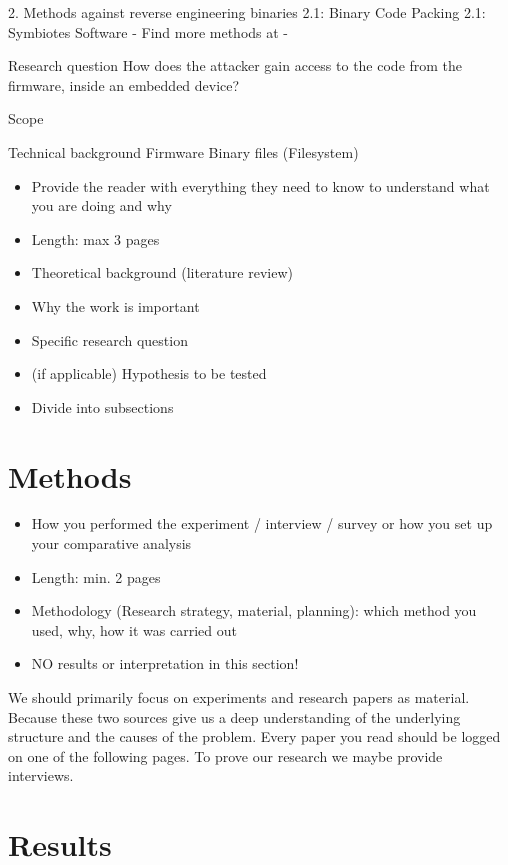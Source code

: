 \documentclass[]{report}
\begin{document}
2. Methods against reverse engineering binaries
2.1: Binary Code Packing
2.1: Symbiotes Software - 
Find more methods at - 

Research question
How does the attacker gain access to the code from the firmware, inside an embedded device?

Scope

Technical background
Firmware
Binary files (Filesystem)

\begin{itemize}
	\item Provide the reader with everything they need to know to understand what you are doing and why

	\item Length: max 3 pages
	\item Theoretical background (literature review)
	\item Why the work is important
	\item Specific research question
	\item (if applicable) Hypothesis to be tested
	\item Divide into subsections
\end{itemize}



\section{Methods}
\begin{itemize}
	\item How you performed the experiment / interview / survey or how you set up your comparative analysis
	\item Length: min. 2 pages
	\item Methodology (Research strategy, material, planning): which method you used, why, how it was carried out
	\item NO results or interpretation in this section!
\end{itemize}

We should primarily focus on experiments and research papers as material. Because these two sources give us a deep understanding of the underlying structure and the causes of the problem. Every paper you read should be logged on one of the following pages. To prove our research we maybe provide interviews.

\section{Results}
\end{document}
